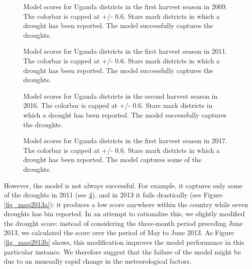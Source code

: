\documentclass[10pt,parskip=half,
toc=sectionentrywithdots,
bibliography=totocnumbered,
captions=tableheading,numbers=noendperiod]{scrartcl}
\begin{document}
\begin{figure}[H]\begin{center}\end{center}\caption{Model scores for Uganda districts in the first harvest season in 2009.
The colorbar is capped at +/- 0.6. Stars mark districts in which a
drought has been reported. The model successfully captures the droughts.}\label{fig_map2009}\end{figure}

\begin{figure}[H]\begin{center}\end{center}\caption{Model scores for Uganda districts in the first harvest season in 2011.
The colorbar is capped at +/- 0.6. Stars mark districts in which a
drought has been reported. The model successfully captures the droughts.}\label{fig_map2011}\end{figure}

\begin{figure}[H]\begin{center}\end{center}\caption{Model scores for Uganda districts in the second harvest season in 2016.
The colorbar is capped at +/- 0.6. Stars mark districts in which a
drought has been reported. The model successfully captures the droughts.}\label{fig_map2016}\end{figure}

\begin{figure}[H]\begin{center}\end{center}\caption{Model scores for Uganda districts in the first harvest season in 2017.
The colorbar is capped at +/- 0.6. Stars mark districts in which a
drought has been reported. The model captures some of the droughts.}\label{fig_map2017}\end{figure}

However, the model is not always successful. For example, it captures
only some of the droughts in 2011 (see \ref{fig_map2017}), and in 2013
it fails drastically (see Figure \ref{fig_map2013a}): it produces a low
score anywhere within the country while seven droughts has bin reported.
In an attempt to rationalize this, we slightly modified the drought
score: instead of considering the three-month period preceding June
2013, we calculated the score over the period of May to June 2013. As
Figure \ref{fig_map2013b} shows, this modification improves the model
performance in this particular instance. We therefore suggest that the
failure of the model might be due to an unusually rapid change in the
meteorological factors.
\end{document}
